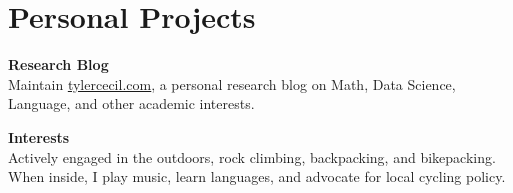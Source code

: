 \documentclass{tc_cv}
\begin{document}
\begin{minipage}[t]{0.3\linewidth}
  \vspace{2em}
  \section{Personal Projects}
  \textbf{Research Blog}\\
  Maintain \href{https://tylercecil.com}{\ul{tylercecil.com}}, a personal
  research blog on Math, Data Science, Language, and other academic interests.
  \vspace{0.25em}

  \textbf{Interests}\\
  Actively engaged in the outdoors, rock climbing, backpacking, and
  bikepacking. When inside, I play music, learn languages, and advocate for
  local cycling policy.

\end{minipage}
\hfill\vline\hfill
\end{document}
